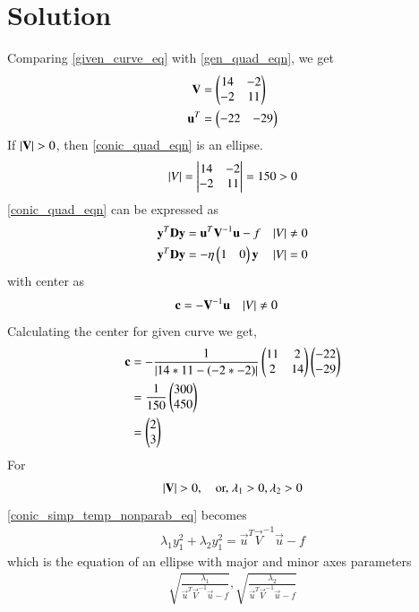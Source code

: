\documentclass[journal,12pt,twocolumn]{IEEEtran}
\begin{document}
\section{Solution}

Comparing \eqref{given_curve_eq} with \eqref{gen_quad_eqn}, we get
\begin{align}
\mathbf{V} &= \begin{pmatrix}14  & -2 \\ -2 & 11\end{pmatrix}
\\
\mathbf{u}^T &= \begin{pmatrix}-22 & -29\end{pmatrix}
\end{align}
If $\left\vert\mathbf{V}\right\vert > 0$, then \eqref{conic_quad_eqn} is an ellipse. 
\begin{align}
\left\vert V\right\vert = \begin{vmatrix}14 & -2 \\ -2 & 11\end{vmatrix} = 150 > 0
\end{align}
\eqref{conic_quad_eqn} can be expressed as
\begin{align}
\label{conic_simp_temp_nonparab_eq}
\mathbf{y}^T\mathbf{D}\mathbf{y} &=  \mathbf{u}^T\mathbf{V}^{-1}\mathbf{u} -f  &  \left\vert V\right\vert &\ne 0
\\
\mathbf{y}^T\mathbf{D}\mathbf{y} &=  -\eta\begin{pmatrix}1 & 0\end{pmatrix}\mathbf{y}   & \left\vert V\right\vert &= 0
\label{conic_simp_temp_parab_eq}
\end{align}
with center as 
\begin{align}
    \mathbf{c} &= - \mathbf{V}^{-1}\mathbf{u} & \left\vert V\right\vert &\ne 0
\end{align}
Calculating the center for given curve we get,
\begin{align}
    \mathbf{c} &= - \frac{1}{\left\vert14*11 - \left(-2*-2\right)\right\vert}\begin{pmatrix}11  & 2 \\ 2 & 14\end{pmatrix}\begin{pmatrix}-22 \\ -29\end{pmatrix} \\
    &= \frac{1}{150}\begin{pmatrix}300 \\ 450\end{pmatrix} \\
    &= \begin{pmatrix}2 \\ 3\end{pmatrix}
\end{align}
For 
\begin{align} 
\left\vert\mathbf{V}\right\vert > 0, \quad \text{or, } \lambda_1 > 0, \lambda_2 > 0 
\end{align} 
\eqref{conic_simp_temp_nonparab_eq} becomes 
\begin{align} \lambda_1y_1^2 +\lambda_2y_1^2 = 
\vec{u}^T\vec{V}^{-1}\vec{u} -f 
\end{align} 
which is the equation of an ellipse with major and minor axes 
parameters
\begin{align} 
\sqrt{\frac{\lambda_1}{\vec{u}^T\vec{V}^{-1}\vec{u} -f}}, 
\sqrt{\frac{\lambda_2}{\vec{u}^T\vec{V}^{-1}\vec{u} -f}} \label{axes_eq}
\end{align}
\end{document}
